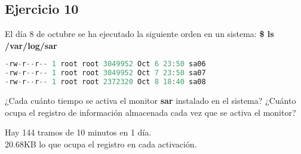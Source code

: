 \subsection{Ejercicio 10}
\noindent
El día 8 de octubre se ha ejecutado la siguiente orden en un sistema: \textbf{\$ ls /var/log/sar}
\begin{lstlisting}[language=C]
-rw-r--r-- 1 root root 3049952 Oct 6 23:50 sa06
-rw-r--r-- 1 root root 3049952 Oct 7 23:50 sa07
-rw-r--r-- 1 root root 2372320 Oct 8 18:40 sa08
\end{lstlisting} 
¿Cada cuánto tiempo se activa el monitor \textbf{sar} instalado en el sistema? ¿Cuánto ocupa el registro de información almacenada cada vez que se activa el monitor?
\begin{tcolorbox}[colback=white,colframe=cyan!50!black,fonttitle=\bfseries]
Hay 144 tramos de 10 minutos en 1 día.\\
20.68KB lo que ocupa el registro en cada activación.
\end{tcolorbox}